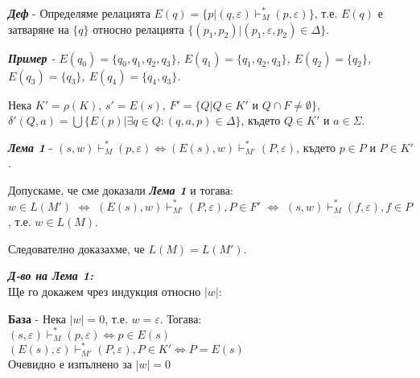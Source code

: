 \documentclass[fleqn,12pt]{article}
\begin{document}
\begin{flushleft}
\textit{\textbf{Деф}} - Определяме релацията $E(q) = \{p | (q, \varepsilon) \vdash_M^* (p, \varepsilon)\}$, т.е. $E(q)$ е затваряне на $\{q\}$ относно релацията $\{(p_1, p_2) | (p_1, \varepsilon, p_2) \in \Delta\}$.

\textit{\textbf{Пример} - $E(q_0) = \{q_0, q_1, q_2, q_3\}$, $E(q_1) = \{q_1, q_2, q_3\}$, $E(q_2) = \{q_2\}$, $E(q_3) = \{q_3\}$, $E(q_4) = \{q_4, q_3\}$.}


Нека $K' = \rho(K)$, $s' = E(s)$, $F' = \{Q | Q \in K' $ и $ Q \cap F \neq \emptyset \}$, $\delta'(Q, a) = \bigcup \{E(p) | \exists q \in Q: (q, a, p) \in \Delta\}$, където $Q \in K'$ и $a \in \Sigma$.

\textit{\textbf{Лема 1}} - $(s, w) \vdash_M^* (p, \varepsilon) \iff (E(s), w) \vdash_{M'}^* (P, \varepsilon)$, където $p \in P$ и $P \in K'$.

Допускаме, че сме доказали \textit{\textbf{Лема 1}} и тогава: \\

$w \in L(M')$ $\iff$ $(E(s), w) \vdash_{M'}^* (P, \varepsilon), P \in F'$ $\iff$ $(s, w) \vdash_M^* (f, \varepsilon), f \in P$, т.е. $w \in L(M)$.

Следователно доказахме, че $L(M) = L(M')$.

\textit{\textbf{Д-во  на Лема 1:}} \\

Ще го докажем чрез индукция относно $|w|$:

\textbf{База} - Нека $|w| = 0$, т.е. $w = \varepsilon$. Тогава: \\
$(s, \varepsilon) \vdash_M^* (p, \varepsilon) \iff p \in E(s)$ \\
$(E(s), \varepsilon) \vdash_{M'}^* (P, \varepsilon), P \in K' \iff P = E(s)$ \\
Очевидно е изпълнено за $|w| = 0$ \\


\end{flushleft}
\end{document}
